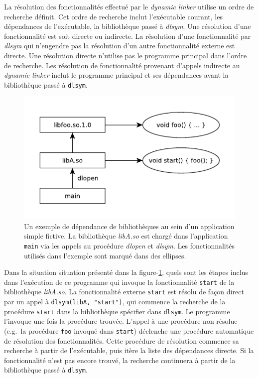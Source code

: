La résolution des fonctionnalités effectué par le \textit{dynamic linker}
utilise un ordre de recherche définit. Cet ordre de recherche inclut
l'exécutable courant, les dépendances de l'exécutable, la bibliothèque passé à
\textit{dlsym}. Une résolution d'une fonctionnalité est soit directe ou
indirecte. La résolution d'une fonctionnalité par \textit{dlsym} qui n'engendre
pas la résolution d'un autre fonctionnalité externe est directe. Une résolution
directe n'utilise pas le programme principal dans l'ordre de recherche.
Les résolution de fonctionnalité provenant d'appels indirecte au
\textit{dynamic linker} inclut le programme principal et ses dépendances avant
la bibliothèque passé à \verb|dlsym|.

\begin{center}
    \begin{figure}[ht]
        \includegraphics{figures/libdeps-ex1.pdf}
        \caption{Un exemple de dépendance de bibliothèques au sein d'un application simple fictive.
            La bibliothèque \textit{libA.so} est chargé dans l'application \texttt{main} via
            les appels au procédure \textit{dlopen} et \textit{dlsym}. Les fonctionnalités utilisés
            dans l'exemple sont marqué dans des ellipses.
        }
        \label{fig:deps-ex1}
    \end{figure}
\end{center}

Dans la situation situation présenté dans la figure-\ref{fig:deps-ex1}, quels sont les étapes inclus
dans l'exécution de ce programme qui invoque la fonctionnalité \texttt{start} de la
bibliothèque \textit{libA.so}. La fonctionnalité externe \texttt{start} est résolu de façon direct par
un appel à \verb|dlsym(libA, "start")|, qui commence la recherche de la procédure \texttt{start} dans
la bibliothèque spécifier dans \texttt{dlsym}. Le programme l'invoque une fois la procédure trouvée.
L'appel à une procédure non résolue (e.g.\ la procédure \texttt{foo} invoqué dans \texttt{start})
déclenche une procédure automatique de résolution des fonctionnalités. Cette procédure de résolution
commence sa recherche à partir de l'exécutable, puis itère la liste des dépendances directe. Si la
fonctionnalité n'est pas encore trouvé, la recherche continuera à partir de la bibliothèque passé à
\texttt{dlsym}.

